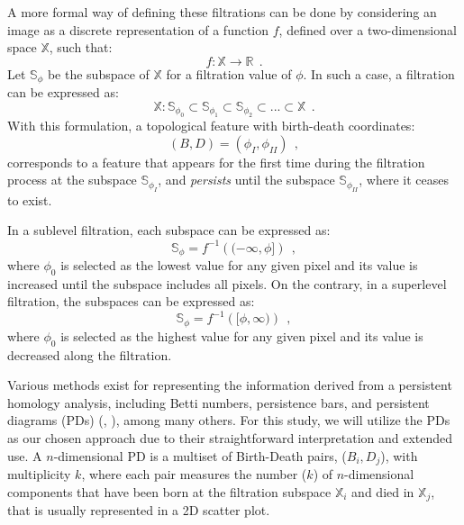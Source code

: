 A more formal way of defining these filtrations can be done by considering an image as a discrete representation of a function $f$, defined over a two-dimensional space $\mathbb{X}$, such that: 
\begin{equation}
    f :  \mathbb{X} \longrightarrow  \mathbb{R} \ \ .
\end{equation}
Let $\mathbb{S} _\phi$ be the subspace of $\mathbb{X}$ for a filtration value of $\phi$. In such a case, a filtration can be expressed as:
\begin{equation}
    \mathbb{X}: \mathbb{S}_{\phi_0} \subset \mathbb{S}_{\phi_1} \subset \mathbb{S}_{\phi_2}\subset... \subset \mathbb{X}\ \ .
\end{equation}
With this formulation, a topological feature with birth-death coordinates:
\begin{equation}
(B, D) = (\phi_ I, \phi _ {II}) \ \ ,
\end{equation} 
corresponds to a feature that appears for the first time during the filtration process at the subspace $\mathbb{S}_{\phi _ I}$, and \textit{persists} until the subspace $\mathbb{S}_{\phi _ {II}}$, where it ceases to exist.

In a sublevel filtration, each subspace can be expressed as:
\begin{equation}
    \mathbb{S} _ \phi = f ^{-1} \left( ( -\infty, \phi ] \right) \ \ ,
    \label{eq: sublevel}
\end{equation}
where $\phi_0$ is selected as the lowest value for any given pixel and its value is increased until the subspace includes all pixels. On the contrary, in a superlevel filtration, the subspaces can be expressed as:
\begin{equation}
    \mathbb{S} _ \phi = f ^{-1} \left( [ \phi, \infty ) \right)\ \ , 
    \label{eq : superlevel}
\end{equation}
where $\phi_0$ is selected as the highest value for any given pixel and its value is decreased along the filtration.

Various methods exist for representing the information derived from a persistent homology analysis, including Betti numbers, persistence bars, and persistent diagrams (PDs) (\citealt{pd_stability}, \citealt{pbars}), among many others. For this study, we will utilize the PDs as our chosen approach due to their straightforward interpretation and extended use. A $n$-dimensional PD is a multiset of Birth-Death pairs, ($B _ i, D _ j$), with multiplicity $k$, where each pair measures the number ($k$) of $n$-dimensional components that have been born at the filtration subspace $\mathbb{X}_i$ and died in $\mathbb{X}_j$, that is usually represented in a 2D scatter plot. 

